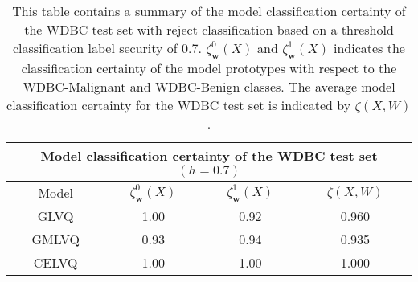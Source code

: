\documentclass[english]{HSMW-Thesis}
\begin{document}
\begin{table}[H]
	\centering
	\begin{tabular}{ |c|c|c|c|  }
		\hline
		\multicolumn{4}{|c|}{Model classification certainty of the WDBC test set $ (h=0.7)$} \\
		\hline
		Model &$\zeta_{\mathbf{w}}^{0}(X) $ & $\zeta_{\mathbf{w}}^{1}(X)$ & $\zeta(X,W)$ \\
		\hline
		GLVQ  &1.00  &0.92   &0.960   \\
		GMLVQ &0.93  & 0.94   &0.935  \\
		CELVQ &1.00  &1.00   &1.000   \\	
		\hline
	\end{tabular}
	\caption[Summary of model classification certainty of the WDBC test set with threshold security]{\label{tab:WDBC certainty_}This table contains a summary of the model classification certainty of the WDBC test set with reject classification based on a threshold classification label security of 0.7.\hspace{2pt} $\zeta_{\mathbf{w}}^{0}(X) $\hspace{2pt} and\hspace{2pt} $\zeta_{\mathbf{w}}^{1}(X)$ \hspace{2pt} indicates the classification certainty of the model prototypes with respect to the WDBC-Malignant and WDBC-Benign classes. The average model classification certainty for the WDBC test set is indicated by\hspace{2pt} $\zeta(X,W)$.}
\end{table}
\end{document}
